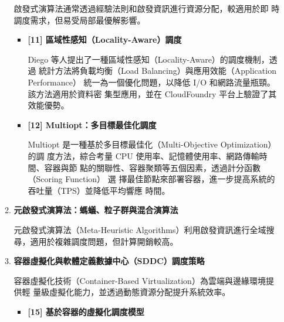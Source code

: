 \documentclass[12pt,a4paper]{article}
\begin{document}
\begin{enumerate}[label={(\zhdig*)}, leftmargin=2\parindent, listparindent=\parindent]
\begin{enumerate}[label={(\arabic*)}, leftmargin=\parindent, listparindent=\parindent]
啟發式演算法通常透過經驗法則和啟發資訊進行資源分配，較適用於即
時調度需求，但易受局部最優解影響。
\begin{itemize}[leftmargin=\parindent, listparindent=\parindent]
    \item \textbf{
[11] 區域性感知（Locality-Aware）調度}

Diego 等人提出了一種區域性感知（Locality-Aware）的調度機制，透過
統計方法將負載均衡（Load Balancing）與應用效能（Application Performance）
統一為一個優化問題，以降低 I/O 和網路流量瓶頸。該方法適用於資料密
集型應用，並在 CloudFoundry 平台上驗證了其效能優勢。
\item \textbf{
[12] Multiopt：多目標最佳化調度
}

Multiopt 是一種基於多目標最佳化（Multi-Objective Optimization）的調
度方法，綜合考量 CPU 使用率、記憶體使用率、網路傳輸時間、容器與節
點的關聯性、容器聚類等五個因素，透過計分函數（Scoring Function） 選
擇最佳節點來部署容器，進一步提高系統的吞吐量（TPS）並降低平均響應
時間。

    \end{itemize}
    \item \textbf{
元啟發式演算法：螞蟻、粒子群與混合演算法
}

元啟發式演算法（Meta-Heuristic Algorithms）利用啟發資訊進行全域搜
尋，適用於複雜調度問題，但計算開銷較高。
    \item \textbf{
容器虛擬化與軟體定義數據中心（SDDC）調度策略
}

容器虛擬化技術（Container-Based Virtualization）為雲端與邊緣環境提供輕
量級虛擬化能力，並透過動態資源分配提升系統效率。
\begin{itemize}[leftmargin=\parindent, listparindent=\parindent]
    \item \textbf{
[15] 基於容器的虛擬化調度模型
    }


\end{itemize}
\end{enumerate}
\end{enumerate}
\end{document}
